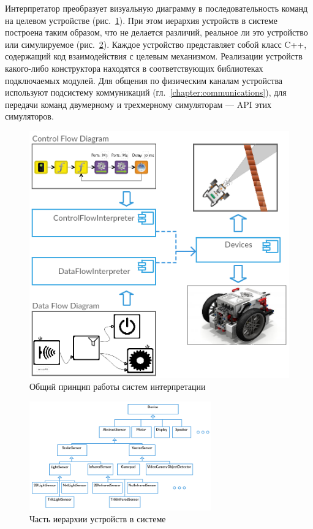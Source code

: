 \documentclass[conference]{IEEEtran}
\begin{document}
Интерпретатор преобразует визуальную диаграмму в последовательность команд на целевом устройстве (рис.~\ref{image:interpretersTSArch}). При этом иерархия устройств в системе построена таким образом, что не делается различий, реальное ли это устройство или симулируемое (рис.~\ref{image:devicesTSArch}). Каждое устройство представляет собой класс C++, содержащий код взаимодействия с целевым механизмом. Реализации устройств какого-либо конструктора находятся в соответствующих библиотеках подключаемых модулей. Для общения по физическим каналам устройства используют подсистему коммуникаций (гл.~\ref{chapter:communications}), для передачи команд двумерному и трехмерному симуляторам --- API этих симуляторов.

\begin{figure}[ht]
    \centering
    \includegraphics[width=0.9\columnwidth]{TS_Interpreter_Architecture.png}
    \caption{Общий принцип работы систем интерпретации}
    \label{image:interpretersTSArch}
\end{figure}

\begin{figure}[ht]
    \centering
    \includegraphics[width=0.7\textwidth]{TS_Devices_Architecture.png}
    \caption{Часть иерархии устройств в системе}
    \label{image:devicesTSArch}
\end{figure}
\end{document}
